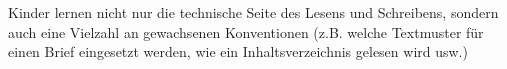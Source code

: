 Kinder lernen nicht nur die technische Seite des Lesens und Schreibens, sondern auch eine Vielzahl an gewachsenen Konventionen (z.B. welche Textmuster für einen Brief eingesetzt werden, wie ein Inhaltsverzeichnis gelesen wird usw.)
